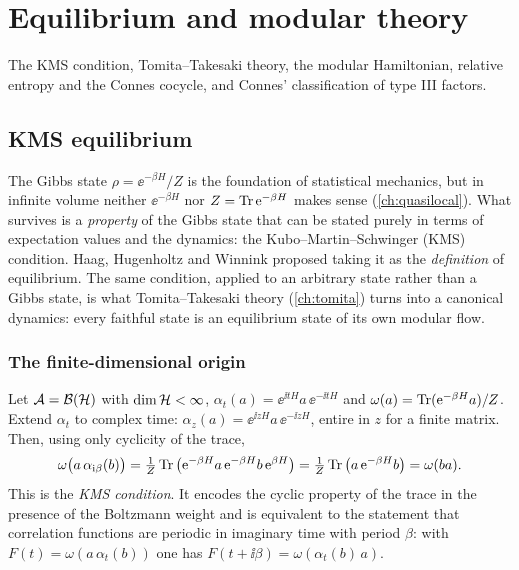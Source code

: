 \chapter{Equilibrium and modular theory}\label{ch:modular}

The KMS condition, Tomita--Takesaki theory, the modular Hamiltonian, relative entropy and the Connes cocycle, and Connes' classification of type III factors.

\section{KMS equilibrium}\label{ch:kms}

\begin{physmotiv}
The Gibbs state $\rho=\ee^{-\beta H}/Z$ is the foundation of statistical mechanics, but in infinite volume neither $\ee^{-\beta H}$ nor $Z=\operatorname{Tr}\mathrm{e}^{-\beta H}$ makes sense (\cref{ch:quasilocal}). What survives is a \emph{property} of the Gibbs state that can be stated purely in terms of expectation values and the dynamics: the Kubo--Martin--Schwinger (KMS) condition. Haag, Hugenholtz and Winnink proposed taking it as the \emph{definition} of equilibrium. The same condition, applied to an arbitrary state rather than a Gibbs state, is what Tomita--Takesaki theory (\cref{ch:tomita}) turns into a canonical dynamics: every faithful state is an equilibrium state of its own modular flow.
\end{physmotiv}

\subsection{The finite-dimensional origin}

Let $\mathcal{A}=\mathcal{B}(\mathcal{H})$ with $\dim\mathcal{H}<\infty$, $\alpha_t(a)=\ee^{\ii tH}a\,\ee^{-\ii tH}$ and $\omega(a)=\operatorname{Tr}(\mathrm{e}^{-\beta H}a)/Z$. Extend $\alpha_t$ to complex time: $\alpha_{z}(a)=\ee^{\ii zH}a\,\ee^{-\ii zH}$, entire in $z$ for a finite matrix. Then, using only cyclicity of the trace,
\begin{equation}
\omega\big(a\,\alpha_{\mathrm{i}\beta}(b)\big)=\tfrac1Z\operatorname{Tr}\big(\mathrm{e}^{-\beta H}a\,\mathrm{e}^{-\beta H}b\,\mathrm{e}^{\beta H}\big)=\tfrac1Z\operatorname{Tr}\big(a\,\mathrm{e}^{-\beta H}b\big)=\omega(ba).\label{eq:kmsfinite}
\end{equation}
This is the \emph{KMS condition}. It encodes the cyclic property of the trace in the presence of the Boltzmann weight and is equivalent to the statement that correlation functions are periodic in imaginary time with period $\beta$: with $F(t)=\omega(a\,\alpha_t(b))$ one has $F(t+\ii\beta)=\omega(\alpha_t(b)\,a)$.

